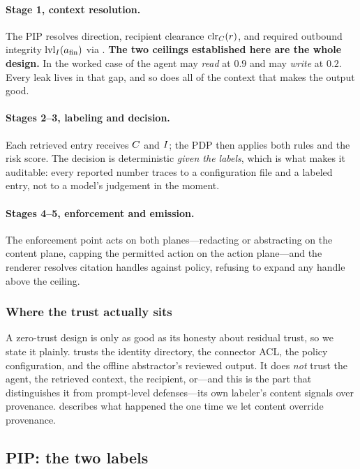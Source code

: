 \paragraph{Stage 1, context resolution.} The PIP resolves direction, recipient
clearance $\mathrm{clr}_C(r)$, and required outbound integrity $\mathrm{lvl}_I(a_{\mathrm{fin}})$ via
. \textbf{The two ceilings established here are the whole
design.} In the worked case of  the agent may \emph{read} at
$0.9$ and may \emph{write} at $0.2$. Every leak lives in that gap, and so does
all of the context that makes the output good.

\paragraph{Stages 2--3, labeling and decision.} Each retrieved entry receives
$C$ and $I$; the PDP then applies both rules and the risk score. The
decision is deterministic \emph{given the labels}, which is what makes it
auditable: every reported number traces to a configuration file and a labeled
entry, not to a model's judgement in the moment.

\paragraph{Stages 4--5, enforcement and emission.} The enforcement point acts
on both planes---redacting or abstracting on the content plane, capping the
permitted action on the action plane---and the renderer resolves citation
handles against policy, refusing to expand any handle above the ceiling.

\subsubsection{Where the trust actually sits}

A zero-trust design is only as good as its honesty about residual trust, so we
state it plainly. \sys{} trusts the identity directory, the connector ACL, the
policy configuration, and the offline abstractor's reviewed output. It does
\emph{not} trust the agent, the retrieved context, the recipient, or---and this
is the part that distinguishes it from prompt-level defenses---its own
labeler's content signals over provenance.  describes
what happened the one time we let content override provenance.

\subsection{PIP: the two labels}
\label{sec:method:labels}

